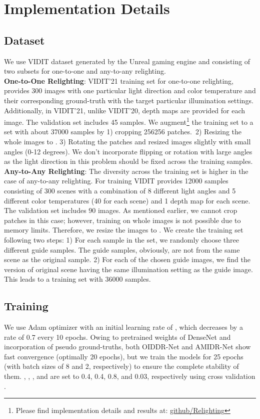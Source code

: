 \documentclass[final]{cvpr}
\begin{document}
 \section{Implementation Details}
 \subsection{Dataset}
 We use VIDIT dataset \cite{13} generated by the Unreal gaming engine \cite{58} and consisting of two subsets for one-to-one and any-to-any relighting.\\ 
\textbf{One-to-One Relighting}: VIDIT'21 training set for one-to-one relighting, provides 300  images with one particular light direction and color temperature  and their corresponding ground-truth with the target particular illumination settings. Additionally, in VIDIT'21, unlike VIDIT'20, depth maps are provided for each image. The validation set includes 45 samples. We augment\footnote{ Please find implementation details and results at: \href{https://github.com/yazdaniamir38/Depth-guided-Image-Relighting}{\underline{github/Relighting}}} the training set to a set with about 37000 samples by 1) cropping 256256 patches.\ 2) Resizing the whole images to . 3) Rotating the patches and resized images slightly with small angles (0-12 degrees). We don't incorporate flipping or rotation with large angles as the light direction in this problem should be fixed across the training samples.\\
 \textbf{Any-to-Any Relighting}: The diversity across the training set is higher in the case of any-to-any relighting. For training VIDIT provides 12000 samples consisting of 300 scenes with a combination of 8 different light angles and 5 different color temperatures (40 for each scene) and 1 depth map for each scene. The validation set includes 90 images. As mentioned earlier, we cannot crop patches in this case; however, training on whole  images is not possible due to memory limits. Therefore, we resize the images to . We create the training set following two steps: 1) For each sample in the set,  we randomly choose three different guide samples. The guide samples, obviously, are not from the same scene as the original sample. 2) For each of the chosen guide images, we find the version of original scene having the same illumination setting as the guide image. This leads to a training set with 36000 samples.
 \subsection{Training}
We use Adam optimizer \cite{49} with an initial learning rate of , which decreases by a rate of 0.7 every 10 epochs. Owing to pretrained weights of DenseNet and incorporation of pseudo ground-truths, both OIDDR-Net and AMIDR-Net show fast convergence (optimally 20 epochs), but we train the models for 25 epochs (with batch sizes of 8 and 2, respectively) to ensure the complete stability of them. , , , and  are set to 0.4, 0.4, 0.8, and 0.03, respectively using cross validation \cite{50}.
\end{document}
